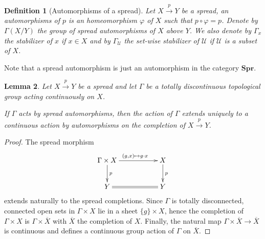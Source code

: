 \documentclass[a4paper,12pt]{article}
\newtheorem{lem}{Lemma}[section]          %
\newtheorem{defi}[lem]{Definition}    %
\def\U{\mathcal U}
\def\U{\mathcal{U}}
\def\CatSpread{\mathbf{Spr}}
\begin{document}
\begin{defi}[Automorphisms of a spread]\label{def:automorphisms_spread} Let $X\xrightarrow{p} Y$ be a spread, an automorphisms of $p$ is an homeomorphism $\varphi$ of $X$ such that $p\circ \varphi = p$. 
Denote by  $\Gamma(X/Y)$ the group of spread automorphisms of $X$ above $Y$. 
We also denote by $\Gamma_x$ the stabilizer of $x$ if $x\in X$ and by $\Gamma_\U$ the set-wise stabilizer of $\U$ if $\U$  is a subset of $X$.
\end{defi}
Note that a spread automorphism is just an automorphism in the category $\CatSpread$.

\begin{lem}\label{lem:group_action} Let $X\xrightarrow{p}Y$  be a spread and let $\Gamma$ be a  totally discontinuous topological group acting continuously on $X$. 

If $\Gamma$ acts by spread automorphisms, then the action of $\Gamma$ extends uniquely to a continuous action by automorphisms on the completion of $X\xrightarrow{p}Y$.
\end{lem}
\begin{proof} 
The spread morphism 
$$\xymatrix{\Gamma\times X \ar[rr]^{(g,x)\mapsto g\cdot x} \ar[d]^p && X \ar[d]^p\\Y \ar@{=}[rr] && Y} $$
 extends naturally to the spread completions. Since $\Gamma$ is totally disconnected, connected open sets in $\Gamma\times X$ lie in a sheet $\{g\}\times X$, hence the completion of $\Gamma\times X$ is $\Gamma \times \overline X$ with $\overline X$ the completion of $X$. Finally,  the natural map $\Gamma\times \overline X \rightarrow \overline X$ is continuous and defines a continuous group action of $\Gamma$ on $\overline X$.
\end{proof}
\end{document}
